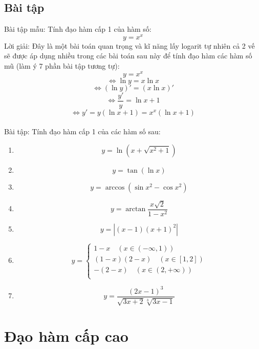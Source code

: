 \subsection{Bài tập}
Bài tập mẫu: Tính đạo hàm cấp 1 của hàm số:
$$y=x^x$$
Lời giải: Đây là một bài toán quan trọng và kĩ năng lấy logarit tự nhiên cả 2 vế sẽ được áp dụng nhiều trong các bài toán sau này để tính đạo hàm các hàm số mũ (làm ý 7 phần bài tập tương tự):
$$y=x^x$$ $$\Leftrightarrow \ln{y}=x\ln{x}$$ $$\Leftrightarrow (\ln{y})'=(x\ln{x})'$$ $$\Leftrightarrow \frac{y'}{y}=\ln{x}+1$$ $$\Leftrightarrow y'=y(\ln{x}+1)=x^x(\ln{x}+1)$$
\\Bài tập: Tính đạo hàm cấp 1 của các hàm số sau:
\begin{enumerate}
    \item $$y=\ln(x+\sqrt{x^2+1})$$
    \item $$y=\tan{(\ln{x})}$$
    \item $$y=\arccos(\sin{x^2}-\cos{x^2})$$
    \item $$y=\arctan{\frac{x\sqrt{2}}{1-x^2}}$$
    \item $$y=|(x-1)(x+1)^2|$$
    \item \begin{equation*}
        y=\left\{\begin{aligned}
            1-x\quad(x\in(-\infty,1))\\
            (1-x)(2-x)\quad(x\in[1,2])\\
            -(2-x)\quad(x\in(2,+\infty))\\
        \end{aligned}\right.
    \end{equation*}
    \item $$y=\frac{(2x-1)^3}{\sqrt{3x+2}\sqrt[3]{3x-1}}$$
\end{enumerate}
\section{Đạo hàm cấp cao}
